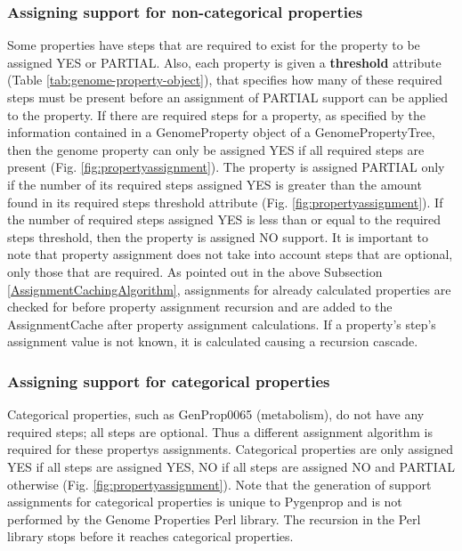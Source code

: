 \subsubsection{Assigning support for non-categorical properties}

Some properties have steps that are required to exist for the property to be assigned YES or PARTIAL. Also, each property is given a \textbf{threshold} attribute (Table \ref{tab:genome-property-object}), that specifies how many of these required steps must be present before an assignment of PARTIAL support can be applied to the property. If there are required steps for a property, as specified by the information contained in a GenomeProperty object of a GenomePropertyTree, then the genome property can only be assigned YES if all required steps are present (Fig. \ref{fig:propertyassignment}). The property is assigned PARTIAL only if the number of its required steps assigned YES is greater than the amount found in its required steps threshold attribute (Fig. \ref{fig:propertyassignment}). If the number of required steps assigned YES is less than or equal to the required steps threshold, then the property is assigned NO support. It is important to note that property assignment does not take into account steps that are optional, only those that are required. As pointed out in the above Subsection \ref{AssignmentCachingAlgorithm}, assignments for already calculated properties are checked for before property assignment recursion and are added to the AssignmentCache after property assignment calculations. If a property's step's assignment value is not known, it is calculated causing a recursion cascade.

\subsubsection{Assigning support for categorical properties}

Categorical properties, such as GenProp0065 (metabolism), do not have any required steps; all steps are optional. Thus a different assignment algorithm is required for these propertys assignments. Categorical properties are only assigned YES if all steps are assigned YES, NO if all steps are assigned NO and PARTIAL otherwise (Fig. \ref{fig:propertyassignment}). Note that the generation of support assignments for categorical properties is unique to Pygenprop and is not performed by the Genome Properties Perl library. The recursion in the Perl library stops before it reaches categorical properties.

